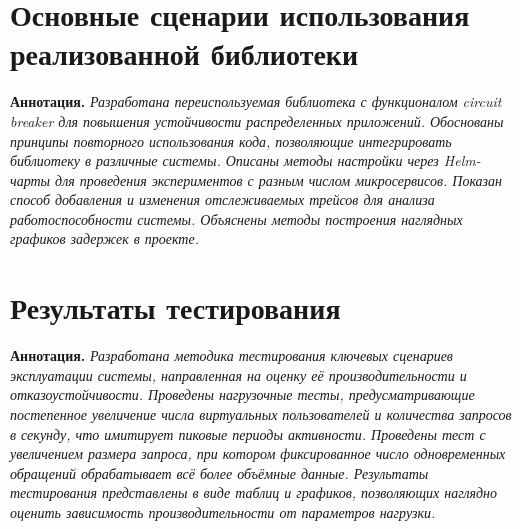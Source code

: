 








\section{Основные сценарии использования реализованной библиотеки }

\textbf{Аннотация. } \textit{ Разработана переиспользуемая библиотека с функционалом circuit breaker для повышения устойчивости распределенных приложений. Обоснованы принципы повторного использования кода, позволяющие интегрировать библиотеку в различные системы. Описаны методы настройки через Helm-чарты для проведения экспериментов с разным числом микросервисов. Показан способ добавления и изменения отслеживаемых трейсов для анализа работоспособности системы. Объяснены методы построения наглядных графиков задержек в проекте.}


\section{Результаты тестирования}

\textbf{Аннотация. } \textit{Разработана методика тестирования ключевых сценариев эксплуатации системы, направленная на оценку её производительности и отказоустойчивости. Проведены нагрузочные тесты, предусматривающие постепенное увеличение числа виртуальных пользователей и количества запросов в секунду, что имитирует пиковые периоды активности.  Проведены тест с увеличением размера запроса, при котором фиксированное число одновременных обращений обрабатывает всё более объёмные данные. Результаты тестирования представлены в виде таблиц и графиков, позволяющих наглядно оценить зависимость производительности от параметров нагрузки.}




